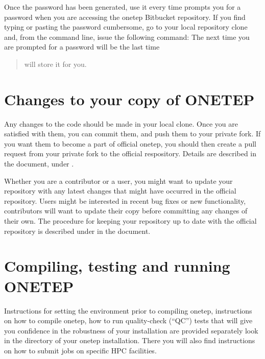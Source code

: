 \documentclass[letterpaper,10pt,english]{sphinxmanual}
\begin{document}
Once the password has been generated, use it every time  prompts
you for a password when you are accessing the onetep Bitbucket
repository. If you find typing or pasting the password cumbersome, go to
your local repository clone and, from the command line, issue the
following command:
\textbar{} 
\textbar{} The next time you are prompted for a password will be the last time \textendash{}
\begin{quote}

 will store it for you.
\end{quote}


\section{Changes to your copy of ONETEP}
\label{\detokenize{starting_with_onetep:changes-to-your-copy-of-onetep}}
Any changes to the code should be made in your local clone. Once you are
satisfied with them, you can commit them, and push them to your private
fork. If you want them to become a part of official onetep, you should
then create a pull request from your private fork to the official
respository. Details are described in the  document, under
.

Whether you are a contributor or a user, you might want to update your
repository with any latest changes that might have occurred in the
official repository. Users might be interested in recent bug fixes or
new functionality, contributors will want to update their copy before
committing any changes of their own. The procedure for keeping your
repository up to date with the official repository is described under
 in the  document.


\section{Compiling, testing and running ONETEP}
\label{\detokenize{starting_with_onetep:compiling-testing-and-running-onetep}}
Instructions for setting the environment prior to compiling onetep,
instructions on how to compile onetep, how to run quality-check (“QC”)
tests that will give you confidence in the robustness of your
installation are provided separately \textendash{} look in the 
directory of your onetep installation. There you will also find
instructions on how to submit jobs on specific HPC facilities.
\end{document}
